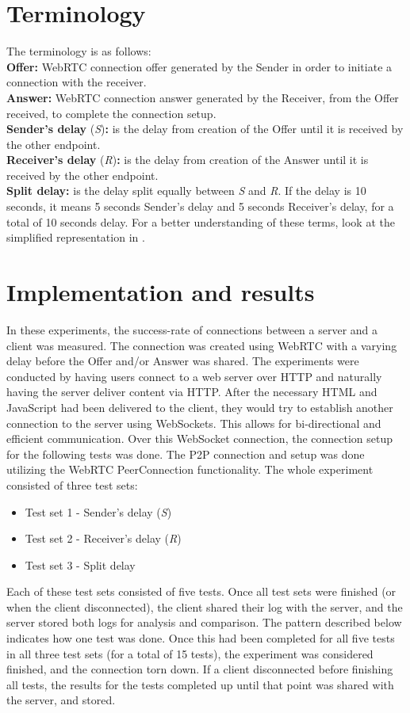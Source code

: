 \section{Terminology}
%
The terminology is as follows:\\
{\bfseries Offer:} WebRTC connection offer generated by the Sender in order to initiate a connection with the receiver.\\
{\bfseries Answer:} WebRTC connection answer generated by the Receiver, from the Offer received, to complete the connection setup.\\
{\bfseries Sender's delay} (\textit{S}){\bfseries :} is the delay from creation of the Offer until it is received by the other endpoint.\\
{\bfseries Receiver's delay} (\textit{R}){\bfseries :} is the delay from creation of the Answer until it is received by the other endpoint.\\
{\bfseries Split delay:} is the delay split equally between \textit{S} and \textit{R}. If the delay is 10 seconds, it means 5 seconds Sender's delay and 5 seconds Receiver's delay, for a total of 10 seconds delay.
For a better understanding of these terms, look at the simplified representation in .
%
\section{Implementation and results}
%
In these experiments, the success-rate of connections between a server and a client was measured. The connection was created using WebRTC with a varying delay before the Offer and/or Answer was shared. The experiments were conducted by having users connect to a web server over HTTP and naturally having the server deliver content via HTTP. After the necessary HTML and JavaScript had been delivered to the client, they would try to establish another connection to the server using WebSockets. This allows for bi-directional and efficient communication. 
Over this WebSocket connection, the connection setup for the following tests was done. The P2P connection and setup was done utilizing the WebRTC PeerConnection functionality. The whole experiment consisted of three test sets:
%
\begin{itemize}
	\item Test set 1 - Sender's delay (\textit{S})
	\item Test set 2 - Receiver's delay (\textit{R})
	\item Test set 3 - Split delay
\end{itemize}
%
Each of these test sets consisted of five tests. Once all test sets were finished (or when the client disconnected), the client shared their log with the server, and the server stored both logs for analysis and comparison. The pattern described below indicates how one test was done. Once this had been completed for all five tests in all three test sets (for a total of 15 tests), the experiment was considered finished, and the connection torn down. If a client disconnected before finishing all tests, the results for the tests completed up until that point was shared with the server, and stored.


